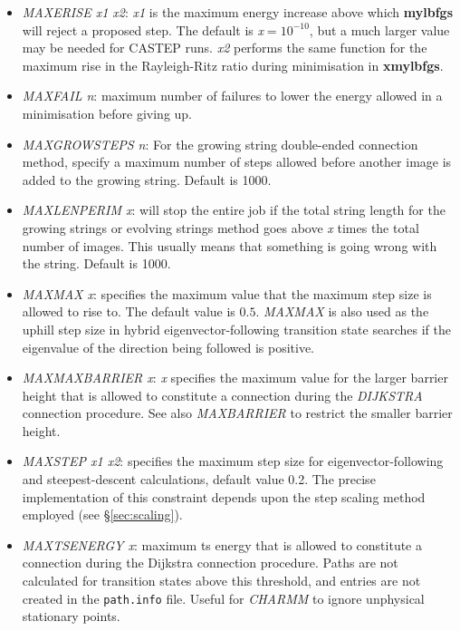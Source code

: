 \documentclass[12pt,a4paper,dvips]{article}
\begin{document}
\begin{itemize}
\item {\it MAXERISE x1 x2\/}: {\it x1} is the maximum energy increase above which
{\bf mylbfgs} will reject a proposed step. The default is {\it x}$=10^{-10}$, but
a much larger value may be needed for CASTEP runs.
{\it x2\/} performs the same function for the maximum rise in the Rayleigh-Ritz ratio
during minimisation in {\bf xmylbfgs}.

\item {\it MAXFAIL n\/}: maximum number of failures 
to lower the energy allowed in a minimisation before giving up.

\item {\it MAXGROWSTEPS n\/}: For the growing string double-ended connection
  method, specify a maximum number of steps allowed before another image is
  added to the growing string. Default is 1000. 

\item {\it MAXLENPERIM x\/}: will stop the entire job if the total string
  length for the growing strings or evolving strings method goes above {\it x}
  times the total number of images. This usually means that something is going
  wrong with the string. Default is 1000. 

\item {\it MAXMAX x\/}: specifies the maximum value that the maximum step size 
is allowed to rise to. The default value is $0.5$.
{\it MAXMAX\/} is also used as the uphill step size in hybrid eigenvector-following
transition state searches if the eigenvalue of the direction being followed is positive.

\item {\it MAXMAXBARRIER x\/}: {\it x\/} specifies the maximum value for the larger barrier height that 
is allowed to constitute a connection during the
{\it DIJKSTRA \/}connection procedure. 
See also {\it MAXBARRIER\/} to restrict the smaller barrier height.

\item {\it MAXSTEP x1 x2\/}: specifies the maximum step size for eigenvector-following and
steepest-descent calculations, default value 0.2. The precise
implementation of this constraint depends upon the step scaling method employed (see \S\ref{sec:scaling}).

\item {\it MAXTSENERGY x\/}: maximum ts energy that is allowed to constitute a connection during the
Dijkstra connection procedure. Paths are not calculated for transition states above
this threshold, and entries are not created in the {\tt path.info} file.
Useful for {\it CHARMM\/} to ignore unphysical stationary points.


\end{itemize}
\end{document}
